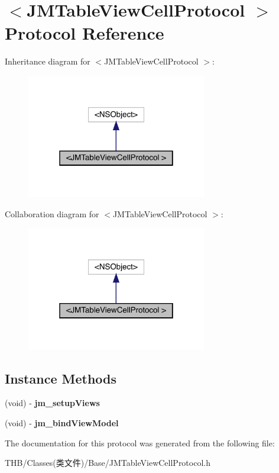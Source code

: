 \hypertarget{protocol_j_m_table_view_cell_protocol_01-p}{}\section{$<$J\+M\+Table\+View\+Cell\+Protocol $>$ Protocol Reference}
\label{protocol_j_m_table_view_cell_protocol_01-p}


Inheritance diagram for $<$J\+M\+Table\+View\+Cell\+Protocol $>$\+:\nopagebreak
\begin{figure}[H]
\begin{center}
\leavevmode
\includegraphics[width=223pt]{protocol_j_m_table_view_cell_protocol_01-p__inherit__graph}
\end{center}
\end{figure}


Collaboration diagram for $<$J\+M\+Table\+View\+Cell\+Protocol $>$\+:\nopagebreak
\begin{figure}[H]
\begin{center}
\leavevmode
\includegraphics[width=223pt]{protocol_j_m_table_view_cell_protocol_01-p__coll__graph}
\end{center}
\end{figure}
\subsection*{Instance Methods}
\begin{DoxyCompactItemize}
\item 
\mbox{\label{protocol_j_m_table_view_cell_protocol_01-p_a4db2e9fe54cdb46802066c5127633b69}} 
(void) -\/ {\bfseries jm\+\_\+setup\+Views}
\item 
\mbox{\label{protocol_j_m_table_view_cell_protocol_01-p_a53384ff2aa7f3d7af0ff374918b4d01d}} 
(void) -\/ {\bfseries jm\+\_\+bind\+View\+Model}
\end{DoxyCompactItemize}


The documentation for this protocol was generated from the following file\+:\begin{DoxyCompactItemize}
\item 
T\+H\+B/\+Classes(类文件)/\+Base/J\+M\+Table\+View\+Cell\+Protocol.\+h\end{DoxyCompactItemize}
